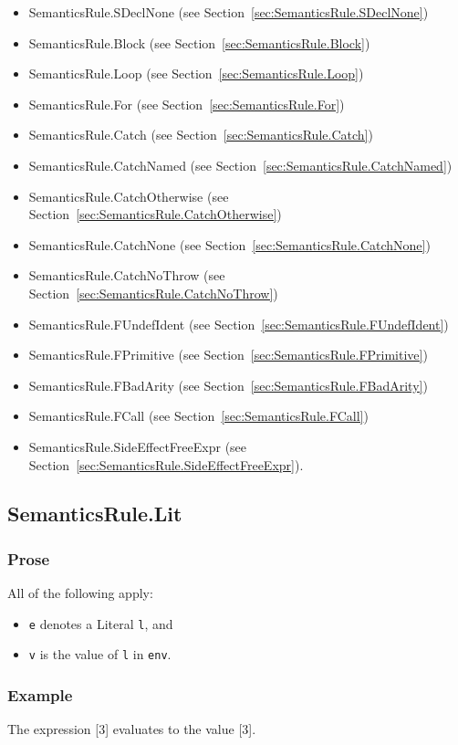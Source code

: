\documentclass{book}
\begin{document}
\begin{itemize}
\item SemanticsRule.SDeclNone (see Section~\ref{sec:SemanticsRule.SDeclNone})
\item SemanticsRule.Block (see Section~\ref{sec:SemanticsRule.Block})
\item SemanticsRule.Loop (see Section~\ref{sec:SemanticsRule.Loop})
\item SemanticsRule.For (see Section~\ref{sec:SemanticsRule.For})
\item SemanticsRule.Catch (see Section~\ref{sec:SemanticsRule.Catch})
\item SemanticsRule.CatchNamed (see Section~\ref{sec:SemanticsRule.CatchNamed})
\item SemanticsRule.CatchOtherwise (see Section~\ref{sec:SemanticsRule.CatchOtherwise})
\item SemanticsRule.CatchNone (see Section~\ref{sec:SemanticsRule.CatchNone})
\item SemanticsRule.CatchNoThrow (see Section~\ref{sec:SemanticsRule.CatchNoThrow})
\item SemanticsRule.FUndefIdent (see Section~\ref{sec:SemanticsRule.FUndefIdent})
\item SemanticsRule.FPrimitive (see Section~\ref{sec:SemanticsRule.FPrimitive})
\item SemanticsRule.FBadArity (see Section~\ref{sec:SemanticsRule.FBadArity})
\item SemanticsRule.FCall (see Section~\ref{sec:SemanticsRule.FCall})
\item SemanticsRule.SideEffectFreeExpr (see Section~\ref{sec:SemanticsRule.SideEffectFreeExpr}).
\end{itemize}

\subsection{SemanticsRule.Lit \label{sec:SemanticsRule.Lit}}

  \subsubsection{Prose}
  All of the following apply:
  \begin{itemize}
  \item \texttt{e} denotes a Literal \texttt{l}, and
  \item \texttt{v} is the value of \texttt{l} in \texttt{env}.
  \end{itemize}

  \subsubsection{Example}
  The expression [3] evaluates to the value [3].
\end{document}
